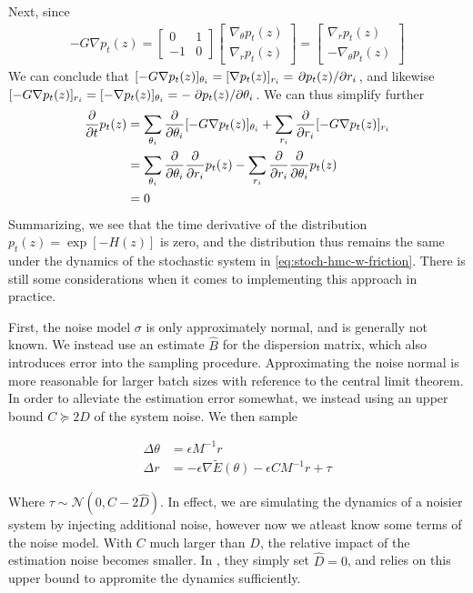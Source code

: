 Next, since 
\begin{align*}
    -G\nabla p_t(z) = \begin{bmatrix}0 & 1 \\ -1 & 0 \end{bmatrix}
    \begin{bmatrix}
        \nabla_\theta p_t(z) \\ 
        \nabla_r p_t(z)
    \end{bmatrix} = \begin{bmatrix}
        \nabla_r p_t(z) \\
        -\nabla_\theta p_t(z) 
    \end{bmatrix}
\end{align*}
We can conclude that $[-G\nabla p_t(z)]_{\theta_i} = [\nabla p_t(z)]_{r_i} = \pdv*{p_t(z)}{r_i}$, and likewise $[-G\nabla p_t(z)]_{r_i} = [-\nabla p_t(z)]_{\theta_i} =-\pdv*{p_t(z)}{\theta_i}$. We can thus simplify further
\begin{align*}
    \pdv{t} p_t(z) 
    &= \sum_{\theta_i} \pdv{\theta_i} [ -G\nabla p_t(z)]_{\theta_i}
        + \sum_{r_i} \pdv{r_i} [ -G\nabla p_t(z)]_{r_i} \\
    &= \sum_{\theta_i} \pdv{\theta_i} \pdv{r_i} p_t(z)
        - \sum_{r_i} \pdv{r_i} \pdv{\theta_i} p_t(z)\\
    &= 0
\end{align*}
Summarizing, we see that the time derivative of the distribution $p_t(z)=\exp[-H(z)]$ is zero, and the distribution thus remains the same under the dynamics of the stochastic system in \cref{eq:stoch-hmc-w-friction}. 
There is still some considerations when it comes to implementing this approach in practice. 

First, the noise model $\sigma$ is only approximately normal, and is generally not known.
We instead use an estimate $\hat{B}$ for the dispersion matrix, which also introduces error into the sampling procedure. 
Approximating the noise normal is more reasonable for larger batch sizes with reference to the central limit theorem.
In order to alleviate the estimation error somewhat, we instead using an upper bound $C \succeq 2D$ of the system noise. We then sample

\begin{align}
    \Delta \theta &=  \epsilon M^{-1} r\\
    \Delta r &=  -\epsilon\nabla\tilde{E}(\theta) - \epsilon CM^{-1}r  + \tau
\end{align}

Where $\tau\sim  \mathcal{N}(0, C - 2\hat{D})$. In effect, we are simulating the dynamics of a noisier system by injecting additional noise, however now we atleast know some terms of the noise model. With $C$ much larger than $D$, the relative impact of the estimation noise becomes smaller. 
In \cite{chen_stochastic_2014}, they simply set $\hat{D} = 0$, and relies on this upper bound to appromite the dynamics sufficiently.  

